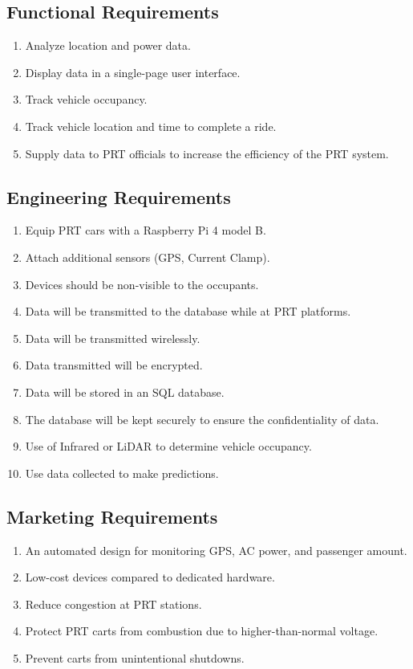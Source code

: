 \subsection{Functional Requirements}
\begin{enumerate}
    \item Analyze location and power data.
    \item Display data in a single-page user interface.
    \item Track vehicle occupancy.
    \item Track vehicle location and time to complete a ride.
    \item Supply data to PRT officials to increase the efficiency of the PRT system.
\end{enumerate}

\subsection{Engineering Requirements}
\begin{enumerate}
    \item Equip PRT cars with a Raspberry Pi 4 model B. 
    \item Attach additional sensors (GPS, Current Clamp).
    \item Devices should be non-visible to the occupants.
    \item Data will be transmitted to the database while at PRT platforms.
    \item Data will be transmitted wirelessly.
    \item Data transmitted will be encrypted. 
    \item Data will be stored in an SQL database.
    \item The database will be kept securely to ensure the confidentiality of data.
    \item Use of Infrared or LiDAR to determine vehicle occupancy.
    \item Use data collected to make predictions.
\end{enumerate}

\subsection{Marketing Requirements}
\begin{enumerate}
    \item An automated design for monitoring GPS, AC power, and passenger amount.
    \item Low-cost devices compared to dedicated hardware.
    \item Reduce congestion at PRT stations.
    \item Protect PRT carts from combustion due to higher-than-normal voltage.
    \item Prevent carts from unintentional shutdowns.
\end{enumerate}

